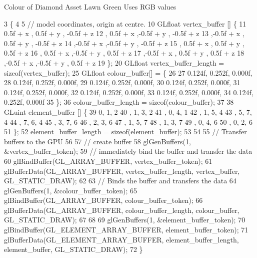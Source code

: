 Colour of Diamond Asset Lawn Green Uses R\+G\+B values
\begin{DoxyCode}
3                                                          \{
4   
5   \textcolor{comment}{// model coordinates, origin at centre.}
10 \textcolor{comment}{}  GLfloat vertex\_buffer [] \{
11       0.5f + x  , 0.5f + y  , -0.5f + z
12     , 0.5f + x  ,-0.5f + y  , -0.5f + z
13     ,-0.5f + x  , 0.5f + y  , -0.5f + z
14     ,-0.5f + x  ,-0.5f + y  , -0.5f + z
15     , 0.5f + x  , 0.5f + y  ,  0.5f + z
16     , 0.5f + x  ,-0.5f + y  ,  0.5f + z
17     ,-0.5f + x  , 0.5f + y  ,  0.5f + z
18     ,-0.5f + x  ,-0.5f + y  ,  0.5f + z
19   \};
20   GLfloat vertex\_buffer\_length = \textcolor{keyword}{sizeof}(vertex\_buffer);
25   GLfloat colour\_buffer[] = \{
26 
27      0.124f, 0.252f, 0.000f,
28      0.124f, 0.252f, 0.000f,
29      0.124f, 0.252f, 0.000f,
30      0.124f, 0.252f, 0.000f,
31      0.124f, 0.252f, 0.000f,
32      0.124f, 0.252f, 0.000f,
33      0.124f, 0.252f, 0.000f,
34      0.124f, 0.252f, 0.000f
35   \};
36   colour\_buffer\_length = \textcolor{keyword}{sizeof}(colour\_buffer);
37   
38   GLuint element\_buffer []  \{
39       0, 1, 2   
40     , 1, 3, 2
41     , 0, 4, 1   
42     , 1, 5, 4   
43     , 5, 7, 4   
44     , 7, 6, 4   
45     , 3, 7, 6   
46     , 2, 3, 6   
47     , 1, 5, 7   
48     , 1, 3, 7   
49     , 0, 4, 6   
50     , 0, 2, 6   
51   \};
52   element\_buffer\_length = \textcolor{keyword}{sizeof}(element\_buffer);
53 
54 
55   \textcolor{comment}{// Transfer buffers to the GPU}
56 
57   \textcolor{comment}{// create buffer}
58   glGenBuffers(1, &vertex\_buffer\_token);
59   \textcolor{comment}{// immediately bind the buffer and transfer the data}
60   glBindBuffer(GL\_ARRAY\_BUFFER, vertex\_buffer\_token);
61   glBufferData(GL\_ARRAY\_BUFFER, vertex\_buffer\_length, vertex\_buffer, GL\_STATIC\_DRAW);
62 
63   \textcolor{comment}{// Binds the buffer and transfers the data}
64   glGenBuffers(1, &colour\_buffer\_token);
65   glBindBuffer(GL\_ARRAY\_BUFFER, colour\_buffer\_token);
66   glBufferData(GL\_ARRAY\_BUFFER, colour\_buffer\_length, colour\_buffer, GL\_STATIC\_DRAW);
67 
68 
69   glGenBuffers(1, &element\_buffer\_token);
70   glBindBuffer(GL\_ELEMENT\_ARRAY\_BUFFER, element\_buffer\_token);
71   glBufferData(GL\_ELEMENT\_ARRAY\_BUFFER, element\_buffer\_length, element\_buffer, GL\_STATIC\_DRAW);
72 \}
\end{DoxyCode}
\hypertarget{classGroundAsset_a8f607f3cabded6280c5a5eb2cbfa8c79}{}
